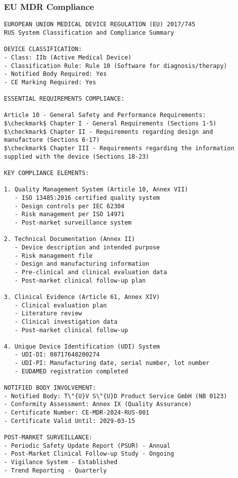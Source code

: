 \subsubsection{EU MDR Compliance}

\begin{lstlisting}[basicstyle=\ttfamily\footnotesize, caption={EU MDR Classification and Requirements}, label={lst:app-eu-mdr}]
EUROPEAN UNION MEDICAL DEVICE REGULATION (EU) 2017/745
RUS System Classification and Compliance Summary

DEVICE CLASSIFICATION:
- Class: IIb (Active Medical Device)
- Classification Rule: Rule 10 (Software for diagnosis/therapy)
- Notified Body Required: Yes
- CE Marking Required: Yes

ESSENTIAL REQUIREMENTS COMPLIANCE:

Article 10 - General Safety and Performance Requirements:
$\checkmark$ Chapter I - General Requirements (Sections 1-5)
$\checkmark$ Chapter II - Requirements regarding design and manufacture (Sections 6-17)
$\checkmark$ Chapter III - Requirements regarding the information supplied with the device (Sections 18-23)

KEY COMPLIANCE ELEMENTS:

1. Quality Management System (Article 10, Annex VII)
   - ISO 13485:2016 certified quality system
   - Design controls per IEC 62304
   - Risk management per ISO 14971
   - Post-market surveillance system

2. Technical Documentation (Annex II)
   - Device description and intended purpose
   - Risk management file
   - Design and manufacturing information
   - Pre-clinical and clinical evaluation data
   - Post-market clinical follow-up plan

3. Clinical Evidence (Article 61, Annex XIV)
   - Clinical evaluation plan
   - Literature review
   - Clinical investigation data
   - Post-market clinical follow-up

4. Unique Device Identification (UDI) System
   - UDI-DI: 08717648200274
   - UDI-PI: Manufacturing date, serial number, lot number
   - EUDAMED registration completed

NOTIFIED BODY INVOLVEMENT:
- Notified Body: T\"{U}V S\"{U}D Product Service GmbH (NB 0123)
- Conformity Assessment: Annex IX (Quality Assurance)
- Certificate Number: CE-MDR-2024-RUS-001
- Certificate Valid Until: 2029-03-15

POST-MARKET SURVEILLANCE:
- Periodic Safety Update Report (PSUR) - Annual
- Post-Market Clinical Follow-up Study - Ongoing
- Vigilance System - Established
- Trend Reporting - Quarterly
\end{lstlisting}

